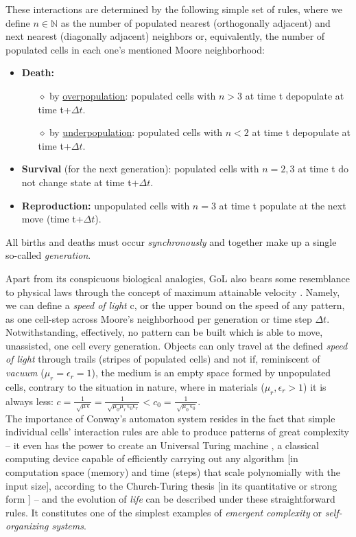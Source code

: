 \documentclass[11pt]{article}
\numberwithin{equation}{section} %
\numberwithin{figure}{section} %
\begin{document}
 These interactions are determined by the following simple set of rules, where we define $n\in\mathbb{N}$ as the number of populated nearest (orthogonally  adjacent) and next nearest (diagonally adjacent) neighbors or, equivalently, the number of populated cells in each one's mentioned Moore neighborhood:
			\begin{itemize}
			\item \textbf{Death:}
			\begin{itemize}
			\item[$\diamond$] by \uline{overpopulation}: populated cells with $n>3$ at time t depopulate at time t+$\Delta t$.
			\item[$\diamond$] by \uline{underpopulation}: populated cells with $n<2$ at time t depopulate at time t+$\Delta t$.
			\end{itemize}
			\item \textbf{Survival} (for the next generation): populated cells with $n=2,3$ at time t do not change state at time t+$\Delta t$.
			\item \textbf{Reproduction:} unpopulated cells with $n=3$ at time t populate at the next move (time t+$\Delta t$).
			
			\end{itemize}
			
All births and deaths must occur \emph{synchronously} and together make up a single so-called \emph{generation}. \cite[p.~2, l.~16-17]{Gardner} \cite[p.~73]{Adamatzky}

Apart from its conspicuous biological analogies, GoL also bears some resemblance to physical laws through the concept of maximum attainable velocity \cite[p.~4, l.~1-2]{Gardner}. Namely, we can define a \emph{speed of light} c, or the upper bound on the speed of any pattern, as one cell-step across Moore's neighborhood per generation or time step $\Delta t$. Notwithstanding, effectively, no pattern can be built which is able to move, unassisted, one cell every generation. Objects can only travel at the defined \emph{speed of light} through trails (stripes of populated cells) and not if, reminiscent of \emph{vacuum} ($\mu_r=\epsilon_r=1$), the medium is an empty space formed by unpopulated cells, contrary to the situation in nature, where in materials ($\mu_r,\epsilon_r>1$) it is always less: $c=\frac{1}{\sqrt[]{\mu\,\epsilon}}=\frac{1}{\sqrt[]{\mu_0\mu_r\,\epsilon_0\epsilon_r}}<c_0=\frac{1}{\sqrt[]{\mu_0\,\epsilon_0}}$.\\
			
The importance of Conway's automaton system resides in the fact that simple individual cells' interaction rules are able to produce patterns of great complexity -- it even has the power to create an Universal Turing machine \cite[p.~520, Fig.~26.1]{Adamatzky}, a classical computing device capable of efficiently carrying out any algorithm [in computation space (memory) and time (steps) that scale polynomially with the input size], according to the Church-Turing thesis \cite[p.~125,l.~10-13]{Nielsen} [in its quantitative or strong form \cite[p.~2,Thesis.~1.1]{Shor}] --  and the evolution of \emph{life} can be described under these straightforward rules. It constitutes one of the simplest examples of \emph{emergent complexity} or \emph{self-organizing systems}.
\end{document}

